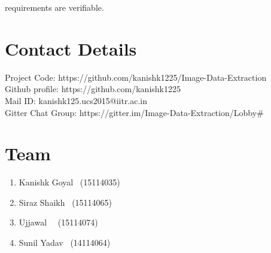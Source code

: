 \documentclass[18 pt]{article}
\begin{document}
\begin{Large}
\begin{flushleft}
\makebox[0pt][l]{$\square$}\raisebox{.15ex}{\hspace{0.1em}$\checkmark$}
requirements are verifiable.

\section{Contact Details} 

Project Code: https://github.com/kanishk1225/Image-Data-Extraction\\
Github profile: https://github.com/kanishk1225\\
Mail ID: kanishk125.ucs2015@iitr.ac.in\\
Gitter Chat Group: https://gitter.im/Image-Data-Extraction/Lobby\#

\section{Team}

\begin{enumerate}
\item Kanishk Goyal \	(15114035)
		
\item Siraz Shaikh 	\	(15114065)
		
\item Ujjawal 	\	\	(15114074)
		
\item Sunil Yadav 	\	(14114064)
\end{enumerate}
\end{flushleft}
\end{Large}
\end{document}

